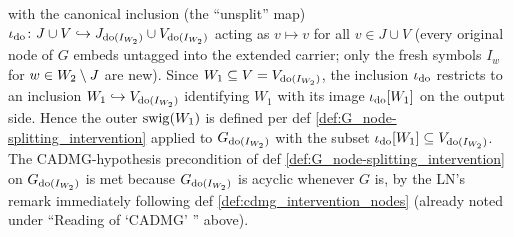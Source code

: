 \documentclass[main]{subfiles}
\begin{document}
\begin{Lem}
\begin{itemize}
              with the canonical inclusion (the ``unsplit'' map) $\iota_{\operatorname{do}} \colon J \cup V \hookrightarrow J_{\operatorname{do}(I_{W_2})} \cup V_{\operatorname{do}(I_{W_2})}$ acting as $v \mapsto v$ for all $v \in J \cup V$ (every original node of $G$ embeds untagged into the extended carrier; only the fresh symbols $I_w$ for $w \in W_2 \setminus J$ are new). Since $W_1 \subseteq V = V_{\operatorname{do}(I_{W_2})}$, the inclusion $\iota_{\operatorname{do}}$ restricts to an inclusion $W_1 \hookrightarrow V_{\operatorname{do}(I_{W_2})}$ identifying $W_1$ with its image $\iota_{\operatorname{do}}[W_1]$ on the output side. Hence the outer $\mathrm{swig}(W_1)$ is defined per def \ref{def:G_node-splitting_intervention} applied to $G_{\operatorname{do}(I_{W_2})}$ with the subset $\iota_{\operatorname{do}}[W_1] \subseteq V_{\operatorname{do}(I_{W_2})}$. The CADMG-hypothesis precondition of def \ref{def:G_node-splitting_intervention} on $G_{\operatorname{do}(I_{W_2})}$ is met because $G_{\operatorname{do}(I_{W_2})}$ is acyclic whenever $G$ is, by the LN's remark immediately following def \ref{def:cdmg_intervention_nodes} (already noted under ``Reading of `CADMG' '' above).
    \end{itemize}


\end{Lem}
\end{document}
